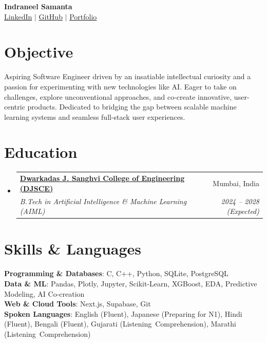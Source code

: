 \documentclass[letterpaper,10pt]{article}
\makeatletter
\newcommand{\resumeSubheading}[4]{
  \item
    \begin{tabular*}{0.98\textwidth}[t]{l@{\extracolsep{\fill}}r}
      \textbf{#1} & \small#2 \\
      \textit{\small#3} & \textit{\small #4} \\
    \end{tabular*}\vspace{1pt}
}
\newcommand{\resumeSubHeadingListStart}{\begin{itemize}[leftmargin=0.12in, label={}, itemsep=4pt, parsep=0pt, topsep=2pt]}
\newcommand{\resumeSubHeadingListEnd}{\end{itemize}}
\makeatother
\begin{document}
\begin{center}
    \textbf{\Huge Indraneel Samanta} \\ \vspace{3pt}
    \small \href{https://linkedin.com/in/indraneel-samanta-724782347}{LinkedIn} $|$
    \href{https://github.com/NotCatfish}{GitHub} $|$
    \href{https://indraneelsamanta.vercel.app/}{Portfolio}
\end{center}
\vspace{-6pt}

\section{Objective}
  \small{Aspiring Software Engineer driven by an insatiable intellectual curiosity and a passion for experimenting with new technologies like AI. Eager to take on challenges, explore unconventional approaches, and co-create innovative, user-centric products. Dedicated to bridging the gap between scalable machine learning systems and seamless full-stack user experiences.}
\vspace{2pt}

\section{Education}
  \resumeSubHeadingListStart
    \resumeSubheading
      {\href{https://www.djsce.ac.in/}{Dwarkadas J. Sanghvi College of Engineering (DJSCE)}}{Mumbai, India}
      {B.Tech in Artificial Intelligence \& Machine Learning (AIML)}{2024 -- 2028 (Expected)}
  \resumeSubHeadingListEnd

\section{Skills \& Languages}
 \begin{itemize}[leftmargin=0.12in, label={}, itemsep=4pt, parsep=0pt, topsep=4pt]
    \small{\item{
     \textbf{Programming \& Databases}{: C, C++, Python, SQLite, PostgreSQL} \\[2pt]
     \textbf{Data \& ML}{: Pandas, Plotly, Jupyter, Scikit-Learn, XGBoost, EDA, Predictive Modeling, AI Co-creation} \\[2pt]
     \textbf{Web \& Cloud Tools}{: Next.js, Supabase, Git} \\[2pt]
     \textbf{Spoken Languages}{: English (Fluent), Japanese (Preparing for N1), Hindi (Fluent), Bengali (Fluent), Gujarati (Listening~Comprehension), Marathi (Listening~Comprehension)}
    }}
 \end{itemize}
\end{document}
